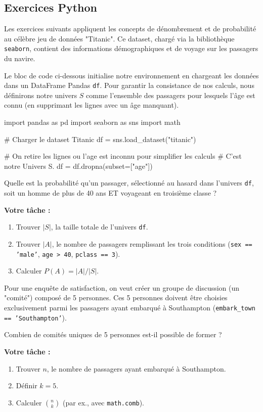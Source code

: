 \subsection{Exercices Python}

Les exercices suivants appliquent les concepts de dénombrement et de probabilité au célèbre jeu de données "Titanic". Ce dataset, chargé via la bibliothèque \texttt{seaborn}, contient des informations démographiques et de voyage sur les passagers du navire.

Le bloc de code ci-dessous initialise notre environnement en chargeant les données dans un DataFrame Pandas \texttt{df}. Pour garantir la consistance de nos calculs, nous définirons notre univers $S$ comme l'ensemble des passagers pour lesquels l'âge est connu (en supprimant les lignes avec un âge manquant).

\begin{codecell}
import pandas as pd
import seaborn as sns
import math

# Charger le dataset Titanic
df = sns.load_dataset("titanic")

# On retire les lignes ou l'age est inconnu pour simplifier les calculs
# C'est notre Univers S.
df = df.dropna(subset=["age"]) 

\end{codecell}

\begin{exercicebox}
Quelle est la probabilité qu'un passager, sélectionné au hasard dans l'univers \texttt{df}, soit un homme de plus de 40 ans ET voyageant en troisième classe ?

\textbf{Votre tâche :}
\begin{enumerate}
    \item Trouver $|S|$, la taille totale de l'univers \texttt{df}.
    \item Trouver $|A|$, le nombre de passagers remplissant les trois conditions (\texttt{sex == 'male'}, \texttt{age > 40}, \texttt{pclass == 3}).
    \item Calculer $P(A) = |A| / |S|$.
\end{enumerate}
\end{exercicebox}

\begin{exercicebox}
Pour une enquête de satisfaction, on veut créer un groupe de discussion (un "comité") composé de 5 personnes. Ces 5 personnes doivent être choisies exclusivement parmi les passagers ayant embarqué à Southampton (\texttt{embark\_town == 'Southampton'}).

Combien de comités uniques de 5 personnes est-il possible de former ?

\textbf{Votre tâche :}
\begin{enumerate}
    \item Trouver $n$, le nombre de passagers ayant embarqué à Southampton.
    \item Définir $k=5$.
    \item Calculer $\binom{n}{k}$ (par ex., avec \texttt{math.comb}).
\end{enumerate}
\end{exercicebox}

